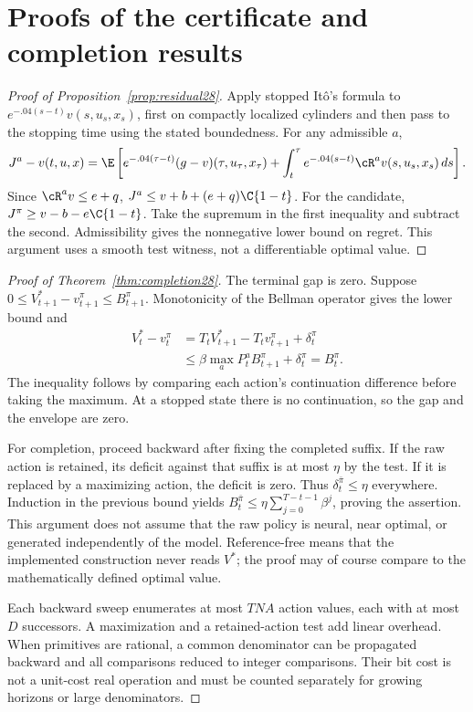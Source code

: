 \section{Proofs of the certificate and completion results}\label{app:completion28}
\begin{proof}[Proof of Proposition~\ref{prop:residual28}]
Apply stopped It\^o's formula to $e^{-.04(s-t)}v(s,u_s,x_s)$, first on compactly localized cylinders and then pass to the stopping time using the stated boundedness. For any admissible $a$,
\begin{equation}
 J^a-v(t,u,x)=\E\left[e^{-.04(\tau-t)}(g-v)(\tau,u_\tau,x_\tau)+\int_t^\tau e^{-.04(s-t)}\cR^av(s,u_s,x_s)\,ds\right].
\end{equation}
Since $\cR^av\le e+q$, $J^a\le v+b+(e+q)\C{1-t}$. For the candidate, $J^\pi\ge v-b-e\C{1-t}$. Take the supremum in the first inequality and subtract the second. Admissibility gives the nonnegative lower bound on regret. This argument uses a smooth test witness, not a differentiable optimal value.
\end{proof}

\begin{proof}[Proof of Theorem~\ref{thm:completion28}]
The terminal gap is zero. Suppose $0\le V_{t+1}^*-v_{t+1}^\pi\le B_{t+1}^\pi$. Monotonicity of the Bellman operator gives the lower bound and
\begin{align}
 V_t^*-v_t^\pi
 &=T_tV_{t+1}^*-T_tv_{t+1}^\pi+\delta_t^\pi\\
 &\le\beta\max_a P_t^a B_{t+1}^\pi+\delta_t^\pi=B_t^\pi.
\end{align}
The inequality follows by comparing each action's continuation difference before taking the maximum. At a stopped state there is no continuation, so the gap and the envelope are zero.

For completion, proceed backward after fixing the completed suffix. If the raw action is retained, its deficit against that suffix is at most $\eta$ by the test. If it is replaced by a maximizing action, the deficit is zero. Thus $\delta_t^{\bar\pi}\le\eta$ everywhere. Induction in the previous bound yields
$B_t^{\bar\pi}\le\eta\sum_{j=0}^{T-t-1}\beta^j$, proving the assertion. This argument does not assume that the raw policy is neural, near optimal, or generated independently of the model. Reference-free means that the implemented construction never reads $V^*$; the proof may of course compare to the mathematically defined optimal value.

Each backward sweep enumerates at most $TNA$ action values, each with at most $D$ successors. A maximization and a retained-action test add linear overhead. When primitives are rational, a common denominator can be propagated backward and all comparisons reduced to integer comparisons. Their bit cost is not a unit-cost real operation and must be counted separately for growing horizons or large denominators.
\end{proof}

